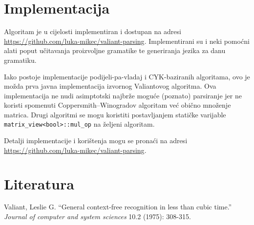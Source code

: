 \documentclass[a4paper,oneside,12pt]{article} %
\begin{document}
    \section{Implementacija}
    
    Algoritam je u cijelosti implementiran i dostupan na adresi
        \url{https://github.com/luka-mikec/valiant-parsing}.
    Implementirani su i neki pomoćni alati poput učitavanja proizvoljne gramatike
        te generiranja jezika za danu gramatiku.
        
    Iako postoje implementacije podijeli-pa-vladaj i CYK-baziranih algoritama,
        ovo je možda prva javna implementacija izvornog Valiantovog algoritma.
    Ova implementacija ne nudi asimptotski najbrže moguće (poznato) parsiranje 
        jer ne koristi spomenuti Coppersmith–Winogradov	
        algoritam već obično množenje matrica. 
    Drugi algoritmi se mogu koristiti postavljanjem statičke varijable
        \verb|matrix_view<bool>::mul_op| na željeni algoritam.
        
    Detalji implementacije i korištenja mogu se pronaći na adresi
        \url{https://github.com/luka-mikec/valiant-parsing}.
        
    
    \section{Literatura}

    \noindent Valiant, Leslie G. ``General context-free recognition in less than cubic time.'' 
    \emph{Journal of computer and system sciences} 10.2 (1975): 308-315.
\end{document}
